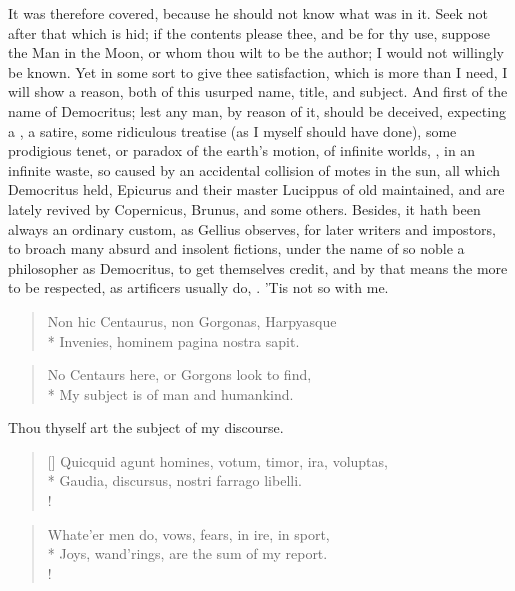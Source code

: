 {It was therefore covered, because he should not know what was in it. Seek not after that
which is hid; if the contents please thee, and be for thy use,
suppose the Man in the Moon, or whom thou wilt to be the author; I
would not willingly be known. Yet in some sort to give thee
satisfaction, which is more than I need, I will show a reason, both of
this usurped name, title, and subject. And first of the name of
Democritus; lest any man, by reason of it, should be deceived,
expecting a , a satire, some ridiculous treatise (as I myself
should have done), some prodigious tenet, or paradox of the earth's
motion, of infinite worlds, , in an infinite waste, so caused by an accidental collision
of motes in the sun, all which Democritus held, Epicurus and their
master Lucippus of old maintained, and are lately revived by
Copernicus, Brunus, and some others. Besides, it hath been always an
ordinary custom, as Gellius observes, for later writers and
impostors, to broach many absurd and insolent fictions, under the name
of so noble a philosopher as Democritus, to get themselves credit, and
by that means the more to be respected, as artificers usually do,
. 'Tis not so with me.
%
\begin{verse}
Non hic Centaurus, non Gorgonas, Harpyasque\\*
Invenies, hominem pagina nostra sapit.
\end{verse}
\translationrule
\begin{verse}
No Centaurs here, or Gorgons look to find,\\*
My subject is of man and humankind.
\end{verse}

Thou thyself art the subject of my discourse.
%
\settowidth{\versewidth}{Quicquid agunt homines, votum, timor, ira, voluptas,}
\begin{verse}[\versewidth]
Quicquid agunt homines, votum, timor, ira, voluptas,\\*
Gaudia, discursus, nostri farrago libelli.\\!
\end{verse}
\translationrule
\begin{verse}
Whate'er men do, vows, fears, in ire, in sport,\\*
Joys, wand'rings, are the sum of my report.\\!
\end{verse}

}

